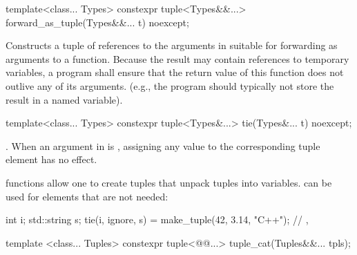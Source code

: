%
%
\begin{itemdecl}
template<class... Types>
  constexpr tuple<Types&&...> forward_as_tuple(Types&&... t) noexcept;
\end{itemdecl}

\begin{itemdescr}
\pnum
\effects Constructs a tuple of references to the arguments in  suitable
for forwarding as arguments to a function. Because the result may contain references
to temporary variables, a program shall ensure that the return value of this
function does not outlive any of its arguments. (e.g., the program should typically
not store the result in a named variable).

\pnum
\returns {}
\end{itemdescr}

%
%
%
\begin{itemdecl}
template<class... Types>
  constexpr tuple<Types&...> tie(Types&... t) noexcept;
\end{itemdecl}

\begin{itemdescr}
\pnum
\returns  {}.  When an
argument in  is , assigning
any value to the corresponding tuple element has no effect.

\pnum
\enterexample
{} functions allow one to create tuples that unpack
tuples into variables.  can be used for elements that
are not needed:
\begin{codeblock}
int i; std::string s;
tie(i, ignore, s) = make_tuple(42, 3.14, "C++");
// , 
\end{codeblock}
\exitexample
\end{itemdescr}

\begin{itemdecl}
template <class... Tuples>
  constexpr tuple<@@...> tuple_cat(Tuples&&... tpls);
\end{itemdecl}

